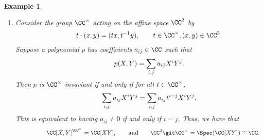 \documentclass[12pt]{amsart}
\theoremstyle{plain}
\newtheorem{example}[theorem]{Example}
\begin{document}
\begin{example}\label{gitexamples}
\begin{enumerate}
\item
Consider the group $\CC^\times$ acting on the affine space $\CC^2$ by 
$$
\hspace{\labelwidth} \hspace{\labelsep} \hspace{\leftmargin}
t \cdot (x, y) = (tx, t^{-1}y), \qquad t \in \CC^\times, (x, y) \in \CC^2.
$$
Suppose a polynomial $p$ has coefficients $a_{ij} \in \CC$ such that
$$
\hspace{\labelwidth} \hspace{\labelsep} \hspace{\leftmargin}
p(X, Y) = \sum_{i, j} a_{ij} X^i Y^j.
$$
Then $p$ is $\CC^\times$ invariant if and only if for all $t \in \CC^\times$,
$$
\hspace{\labelwidth} \hspace{\labelsep} \hspace{\leftmargin}
\sum_{i,j} a_{ij} X^i Y^j = \sum_{i,j} a_{ij} t^{i-j} X^i Y^j.
$$
This is equivalent to having $a_{ij} \ne 0$ if and only if $i = j$.
Thus, we have that
$$
\hspace{\labelwidth} \hspace{\labelsep} \hspace{\leftmargin}
\CC[X, Y]^{\CC^\times} = \CC[XY], \qquad \text{and} \qquad \CC^2 \git \CC^\times = \Spec(\CC[XY]) \cong \CC.
$$


\end{enumerate}
\end{example}
\end{document}
